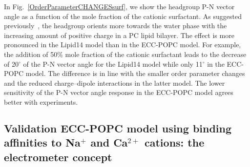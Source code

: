 \documentclass[aip,jcp,twocolumn]{revtex4}
\begin{document}
In Fig.~\ref{OrderParameterCHANGESsurf}, we show the headgroup P-N vector angle as a function of the mole fraction of the cationic surfactant. As suggested previously~\cite{seelig87}, the headgroup orients more towards the water phase with the increasing amount of positive charge in a PC lipid bilayer. The effect is more pronounced in the Lipid14 model than in the ECC-POPC model.   For example, the addition of 50\% mole fraction of the cationic surfactant leads to the decrease of 20$^{\circ}$ of the P-N vector angle for the Lipid14 model while only 11$^{\circ}$ in the ECC-POPC model. The difference is in line with the smaller order parameter changes and the reduced charge--dipole interactions in the latter model. The lower sensitivity of the P-N vector angle response in the ECC-POPC model agrees better with experiments.


%
%


\subsection{Validation ECC-POPC model using binding affinities to Na$^+$ and Ca$^{2+}$ cations: the electrometer concept}
\end{document}
